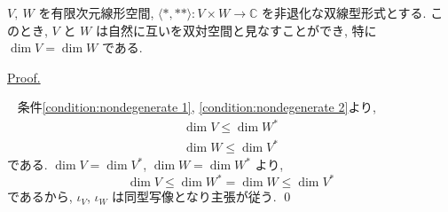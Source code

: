 \documentclass[a4paper,10pt,dvipdfmx]{jsreport}
\newenvironment{prop*}{\refstepcounter{theorem}\begin{itembox}[l]{\underline{Proposition \arabic{chapter}.\arabic{section}.\arabic{theorem}. }}\vspace{-0.5zh}\ }{\end{itembox}}
\renewenvironment{proof}{\begin{flushleft} \underline{Proof.} \end{flushleft}\vspace{-1zh}\ }{\qed\\}
\newcounter{theorem}[section]
\theoremstyle{definition}
\begin{document}
\begin{prop*}
    \(V,\ W\) を有限次元線形空間, \(\langle \ast, \ast \ast \rangle \colon  V \times W \to \mathbb{C}\) を非退化な双線型形式とする. このとき, \(V\) と \(W\) は自然に互いを双対空間と見なすことができ, 特に \(\dim V =\dim W\) である.
\end{prop*}
\begin{proof}
    条件\ref{condition:nondegenerate 1}, \ref{condition:nondegenerate 2}より,
    \begin{align*}
        \dim V \leq \dim W^\ast\\
        \dim W \leq \dim V^\ast
    \end{align*}
    である. \(\dim V = \dim V^\ast\), \(\dim W = \dim W^\ast\) より,
    \[
        \dim V \leq \dim W^\ast = \dim W \leq \dim V^\ast
    \]
    であるから, \(\iota_V\), \(\iota_W\) は同型写像となり主張が従う.
\end{proof}
\end{document}
